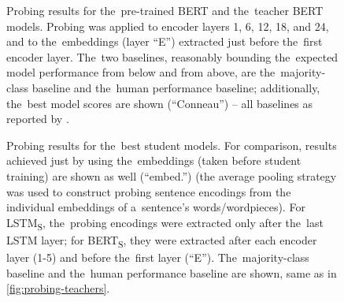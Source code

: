 \documentclass[bsc,frontabs,singlespacing,parskip,deptreport]{infthesis}
\def\BERTS{BERT\textsubscript{S}}
\def\LSTMS{LSTM\textsubscript{S}}
\begin{document}
{{    \begin{figure}[h!b]
      \centering
      \cprotect\caption{Probing results for the~pre-trained BERT and the~teacher BERT models. Probing was applied to encoder layers 1, 6, 12, 18, and 24, and to the~embeddings (layer ``E'') extracted just before the~first encoder layer. The~two baselines, reasonably bounding the~expected model performance from below and from above, are the~majority-class baseline and the~human performance baseline; additionally, the~best model scores are shown (``Conneau'') -- all baselines as reported by \citet{Conneau_2018}.}
      \label{fig:probing-teachers}
    \end{figure}

    \begin{figure}[h!t]
      \centering
      \caption{Probing results for the~best student models. For comparison, results achieved just by using the~embeddings (taken before student training) are shown as well (``embed.'') (the average pooling strategy was used to construct probing sentence encodings from the individual embeddings of a~sentence's words/wordpieces). For \LSTMS, the~probing encodings were extracted only after the~last LSTM layer; for \BERTS, they were extracted after each encoder layer (1-5) and before the~first layer (``E''). The~majority-class baseline and the~human performance baseline are shown, same as in \autoref{fig:probing-teachers}.}
      \label{fig:probing-students}
    \end{figure}

}}
\end{document}
